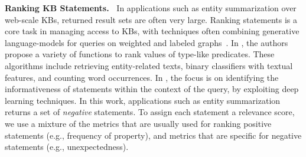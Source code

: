 \noindent
\textbf{Ranking KB Statements.\ } In applications such as entity summarization over web-scale KBs, returned result sets are often very large. Ranking statements is a core task in managing access to KBs, with techniques often combining generative language-models for queries on weighted and labeled graphs~\cite{NAGA,Yahya2016,arnaoutjws2018}. In \cite{Bast}, the authors propose a variety of functions to rank values of type-like predicates. These algorithms include retrieving entity-related texts, binary classifiers with textual features, and counting word occurrences.  In \cite{huang2019contextual}, the focus is on identifying the informativeness of statements within the context of the query, by exploiting deep learning techniques. In this work, applications such as entity summarization returns a set of \textit{negative} statements. To assign each statement a relevance score, we use a mixture of the metrics that are usually used for ranking positive statements (e.g., frequency of property), and metrics that are specific for negative statements (e.g., unexpectedness).





